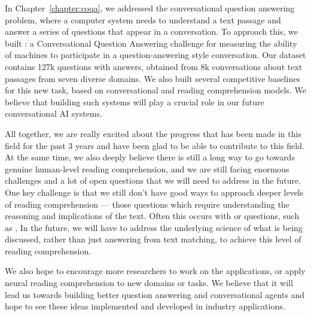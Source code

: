 In Chapter~\ref{chapter:coqa}, we addressed the conversational question answering problem, where a computer system needs to understand a text passage and answer a series of questions that appear in a conversation. To approach this, we built : a Conversational Question Answering challenge for measuring the ability of machines to participate in a question-answering style conversation. Our dataset contains 127k questions with answers, obtained from 8k conversations about text passages from seven diverse domains. We also built several competitive baselines for this new task, based on conversational and reading comprehension models. We believe that building such systems will play a crucial role in our future conversational AI systems.

All together, we are really excited about the progress that has been made in this field for the past 3 years and have been glad to be able to contribute to this field. At the same time, we also deeply believe there is still a long way to go towards genuine human-level reading comprehension, and we are still facing enormous challenges and a lot of open questions that we will need to address in the future. One key challenge is that we still don't have good ways to approach deeper levels of reading comprehension --- those questions which require understanding the reasoning and implications of the text. Often this occurs with  or  questions, such as ,  In the future, we will have to address the underlying science of what is being discussed, rather than just answering from text matching, to achieve this level of reading comprehension.

We also hope to encourage more researchers to work on the applications, or apply neural reading comprehension to new domains or tasks. We believe that it will lead us towards building better question answering and conversational agents and hope to see these ideas implemented and developed in industry applications.
